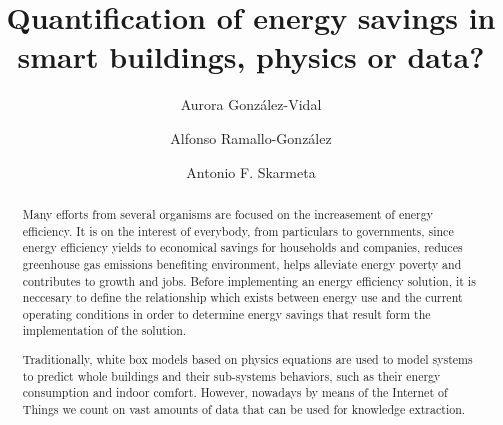 \documentclass[3p,times,procedia]{elsarticle}
\begin{document}
\begin{frontmatter}



\dochead{}

\title{Quantification of energy savings in smart buildings, physics or data?}



\author{Aurora Gonz\'alez-Vidal}
\author{Alfonso Ramallo-Gonz\'alez}
\author{Antonio F. Skarmeta}

\address{}

\begin{abstract}

Many efforts from several organisms are focused on the increasement of energy efficiency. It is on the interest of everybody, from particulars to governments, since energy efficiency yields to economical savings for households and companies, reduces greenhouse gas emissions benefiting environment, helps alleviate energy poverty and contributes to growth and jobs.
Before implementing an energy efficiency solution, it is neccesary to define the relationship which exists between energy use and the current operating conditions in order to determine energy savings that result form the implementation of the solution. 

Traditionally, white box models based on physics equations are used to model systems to predict whole buildings and their sub-systems behaviors, such as their energy consumption and indoor comfort. However, nowadays by means of the Internet of Things we count on vast amounts of data that can be used for knowledge extraction.


\end{abstract}
\end{frontmatter}
\end{document}
